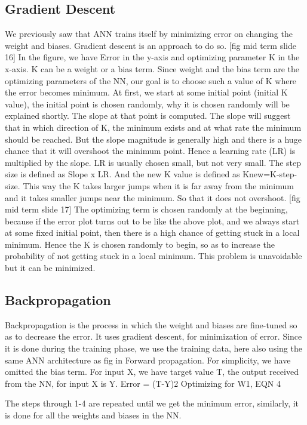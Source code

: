 \subsection{Gradient Descent}
We previously saw that ANN trains itself by minimizing error on changing the weight and biases. Gradient descent is an approach to do so. 
[fig mid term slide 16]
In the figure, we have Error in the y-axis and optimizing parameter K in the x-axis. K can be a weight or a bias term. Since weight and the bias term are the optimizing parameters of the NN, our goal is to choose such a value of K where the error becomes minimum. At first, we start at some initial point (initial K value), the initial point is chosen randomly, why it is chosen randomly will be explained shortly. The slope at that point is computed. The slope will suggest that in which direction of K, the minimum exists and at what rate the minimum should be reached. But the slope magnitude is generally high and there is a huge chance that it will overshoot the minimum point. Hence a learning rate (LR) is multiplied by the slope. LR is usually chosen small, but not very small. The step size is defined as Slope x LR. And the new K value is defined as Knew=K-step-size. This way the K takes larger jumps when it is far away from the minimum and it takes smaller jumps near the minimum. So that it does not overshoot. 
[fig mid term slide 17]
The optimizing term is chosen randomly at the beginning, because if the error plot turns out to be like the above plot, and we always start at some fixed initial point, then there is a high chance of getting stuck in a local minimum. Hence the K is chosen randomly to begin, so as to increase the probability of not getting stuck in a local minimum. This problem is unavoidable but it can be minimized.

\subsection{Backpropagation}
Backpropagation is the process in which the weight and biases are fine-tuned so as to decrease the error. It uses gradient descent, for minimization of error. Since it is done during the training phase, we use the training data, here also using the same ANN architecture as fig in Forward propagation. For simplicity, we have omitted the bias term. For input X, we have target value T, the output received from the NN, for input X is Y.
Error = (T-Y)2
Optimizing for W1, 
EQN 4

The steps through 1-4 are repeated until we get the minimum error, similarly, it is done for all the weights and biases in the NN.

